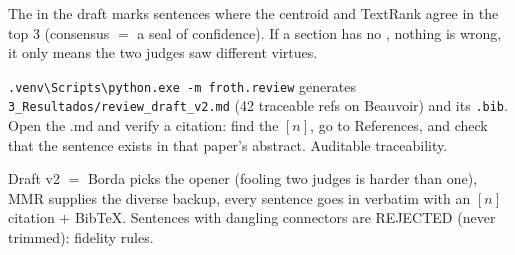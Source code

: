\documentclass[11pt,a4paper]{article}
\begin{document}
\begin{ojo}
The \dag{} in the draft marks sentences where the centroid and TextRank agree in the top 3
(consensus $=$ a seal of confidence). If a section has no \dag, nothing is wrong, it only means
the two judges saw different virtues.
\end{ojo}

\begin{practica}
\texttt{.venv\textbackslash Scripts\textbackslash python.exe -m froth.review} generates
\texttt{3\_Resultados/review\_draft\_v2.md} (42 traceable refs on Beauvoir) and its
\texttt{.bib}. Open the .md and verify a citation: find the $[n]$, go to References, and check
that the sentence exists in that paper's abstract. Auditable traceability.
\end{practica}

\begin{resumen}
Draft v2 $=$ Borda picks the opener (fooling two judges is harder than one), MMR supplies the
diverse backup, every sentence goes in verbatim with an $[n]$ citation $+$ BibTeX. Sentences
with dangling connectors are REJECTED (never trimmed): fidelity rules.
\end{resumen}
\end{document}
